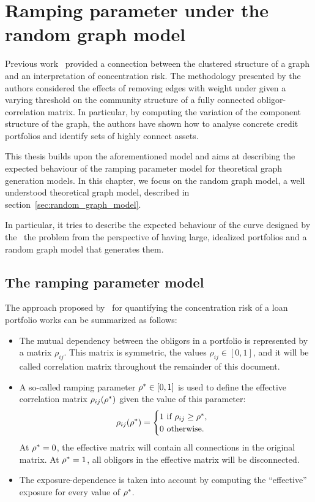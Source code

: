 \chapter{Ramping parameter under the random graph model} %
\label{cha:ramping_parameter_under_the_random_graph_model}

Previous work~\cite{Sindel:2009vd} provided a connection between the clustered structure of a graph and an interpretation of concentration risk.
The methodology presented by the authors considered the effects of removing edges with weight under given a varying threshold on the community structure of a fully connected obligor-correlation matrix.
In particular, by computing the variation of the component structure of the graph, the authors have shown how to analyse concrete credit portfolios and identify sets of highly connect assets.


This thesis builds upon the aforementioned model and aims at describing the expected behaviour of the ramping parameter model for theoretical graph generation models.
In this chapter, we focus on the random graph model, a well understood theoretical graph model, described in section~\vref{sec:random_graph_model}.

In particular, it tries to describe the expected behaviour of the curve designed by the~\cite{Sindel:2009vd} the problem from the perspective of having
large, idealized portfolios 
and a random graph model that generates them.





\section{The ramping parameter model} %
\label{sec:the_ramping_parameter_model}


The approach proposed by~\cite{Sindel:2009vd} for quantifying the concentration risk of a loan portfolio works can be summarized as follows:
\begin{itemize}
	\item The mutual dependency between the obligors in a portfolio is represented by a matrix $\rho_{ij}$. This matrix is symmetric, the values $\rho_{ij} \in [0,1]$, and it will be called correlation matrix throughout the remainder of this document.
	\item A so-called ramping parameter $\rho^* \in [0,1]$ is used to define the effective correlation matrix $\rho_{ij}(\rho^*)$ given the value of this  parameter:
	\begin{equation}
	\rho_{ij}(\rho^*) = 
		\begin{cases}
		1 \text{ if } \rho_{ij} \ge \rho^*,\\
		0 \text{ otherwise}.
		\end{cases}
	\end{equation}
	At $\rho^* = 0$, the effective matrix will contain all connections in the original matrix. At $\rho^* = 1$, all obligors in the effective matrix will be disconnected.
	
	\item The exposure-dependence is taken into account by computing the “effective” exposure for every value of $\rho^*$.
\end{itemize}

